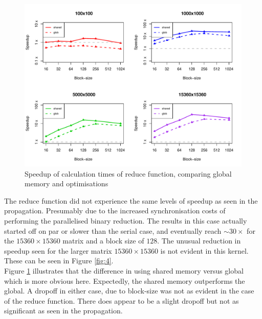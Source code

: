 \documentclass[12pt]{article}
\begin{document}
\begin{figure}
	\centering
	\includegraphics[width=\linewidth]{../plots/red_globvshared.pdf}
	\caption{Speedup of calculation times of reduce function, comparing global memory and optimisations}
	\label{fig:6}
\end{figure}
The reduce function did not experience the same levels of speedup as seen in the propagation. Presumably due to the increased synchronisation costs of performing the parallelised binary reduction. The results in this case actually started off on par or slower than the serial case, and eventually reach $\sim30\times$ for the $15360\times15360$ matrix and a block size of $128$. The unusual reduction in speedup seen for the larger matrix $15360\times15360$ is not evident in this kernel. These can be seen in Figure \ref{fig:4}.\\
Figure \ref{fig:6} illustrates that the difference in using shared memory versus global which is more obvious here. Expectedly, the shared memory outperforms the global. A dropoff in either case, due to block-size was not as evident in the case of the reduce function. There does appear to be a slight dropoff but not as significant as seen in the propagation. 
\end{document}
